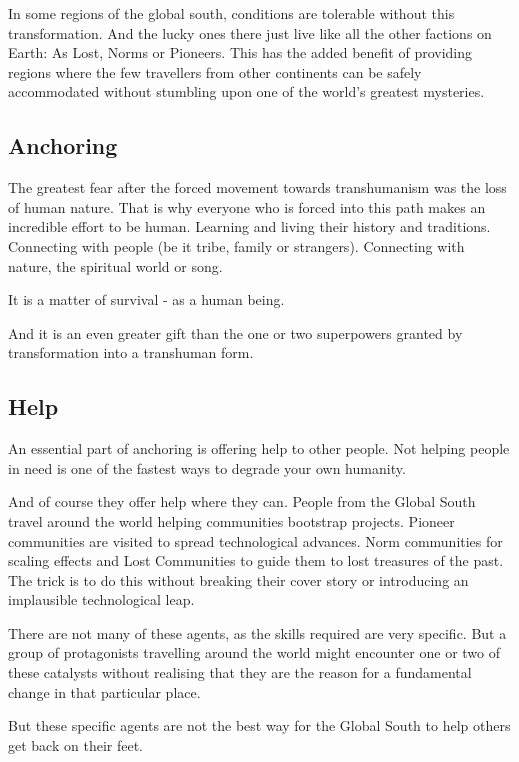 In some regions of the global south, conditions are tolerable without this transformation. And the lucky ones there just live like all the other factions on Earth: As Lost, Norms or Pioneers. This has the added benefit of providing regions where the few travellers from other continents can be safely accommodated without stumbling upon one of the world's greatest mysteries.

\subsection{Anchoring}

The greatest fear after the forced movement towards transhumanism was the loss of human nature.
That is why everyone who is forced into this path makes an incredible effort to be human. Learning and living their history and traditions. Connecting with people (be it tribe, family or strangers). Connecting with nature, the spiritual world or song.

It is a matter of survival - as a human being.

And it is an even greater gift than the one or two superpowers granted by transformation into a transhuman form.

\subsection{Help}

An essential part of anchoring is offering help to other people. Not helping people in need is one of the fastest ways to degrade your own humanity.

And of course they offer help where they can. People from the Global South travel around the world helping communities bootstrap projects. Pioneer communities are visited to spread technological advances. Norm communities for scaling effects and Lost Communities to guide them to lost treasures of the past. The trick is to do this without breaking their cover story or introducing an implausible technological leap.

There are not many of these agents, as the skills required are very specific. But a group of protagonists travelling around the world might encounter one or two of these catalysts without realising that they are the reason for a fundamental change in that particular place.

But these specific agents are not the best way for the Global South to help others get back on their feet.

